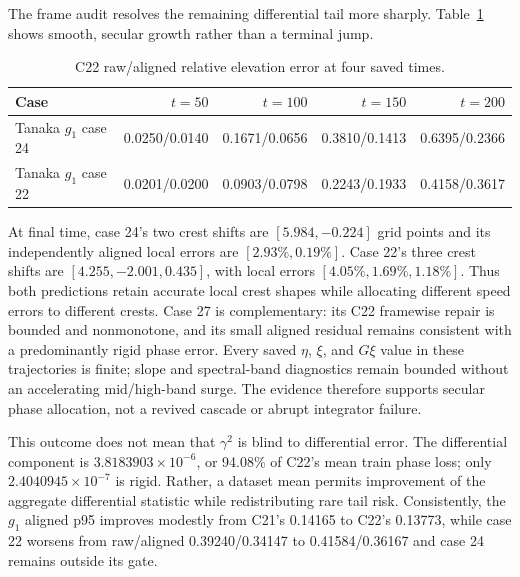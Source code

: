 \documentclass[11pt]{article}
\begin{document}
The frame audit resolves the remaining differential tail more sharply.
Table~\ref{tab:c22-differential-frames} shows smooth, secular growth rather
than a terminal jump.
\begin{table}[htbp]
\centering
\small
\begin{tabular}{lrrrr}
\toprule
Case & $t=50$ & $t=100$ & $t=150$ & $t=200$ \\
\midrule
Tanaka $g_1$ case 24 & 0.0250/0.0140 & 0.1671/0.0656 & 0.3810/0.1413 & 0.6395/0.2366 \\
Tanaka $g_1$ case 22 & 0.0201/0.0200 & 0.0903/0.0798 & 0.2243/0.1933 & 0.4158/0.3617 \\
\bottomrule
\end{tabular}
\caption{C22 raw/aligned relative elevation error at four saved times.}
\label{tab:c22-differential-frames}
\end{table}
At final time, case 24's two crest shifts are
\([5.984,-0.224]\) grid points and its independently aligned local errors are
\([2.93\%,0.19\%]\).  Case 22's three crest shifts are
\([4.255,-2.001,0.435]\), with local errors
\([4.05\%,1.69\%,1.18\%]\).  Thus both predictions retain accurate local crest
shapes while allocating different speed errors to different crests.  Case 27
is complementary: its C22 framewise repair is bounded and nonmonotone, and its
small aligned residual remains consistent with a predominantly rigid phase
error.  Every saved \(\eta\), \(\xi\), and \(G\xi\) value in these trajectories
is finite; slope and spectral-band diagnostics remain bounded without an
accelerating mid/high-band surge.  The evidence therefore supports secular
phase allocation, not a revived cascade or abrupt integrator failure.

This outcome does not mean that \(\gamma^2\) is blind to differential error.
The differential component is \(3.8183903\times10^{-6}\), or 94.08\% of C22's
mean train phase loss; only \(2.4040945\times10^{-7}\) is rigid.  Rather, a
dataset mean permits improvement of the aggregate differential statistic while
redistributing rare tail risk.  Consistently, the \(g_1\) aligned p95 improves
modestly from C21's 0.14165 to C22's 0.13773, while case 22 worsens from
raw/aligned 0.39240/0.34147 to 0.41584/0.36167 and case 24 remains outside its
gate.
\end{document}
